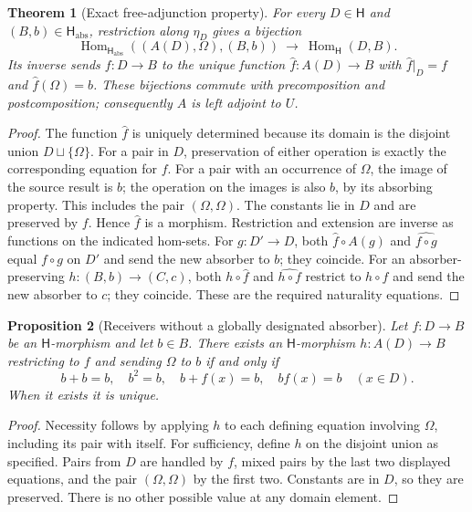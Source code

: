\documentclass[11pt]{article}
\newtheorem{theorem}{Theorem}[section]
\newtheorem{proposition}[theorem]{Proposition}
\theoremstyle{definition}
\newcommand{\HH}{\mathsf H}
\newcommand{\Om}{\Omega}
\begin{document}
\begin{theorem}[Exact free-adjunction property]\label{thm:Auniversal}
For every \(D\in\HH\) and \((B,b)\in\HH_{\mathrm{abs}}\), restriction
along \(\eta_D\) gives a bijection
\[
 \operatorname{Hom}_{\HH_{\mathrm{abs}}}((A(D),\Om),(B,b))
 \ \longrightarrow\ \operatorname{Hom}_{\HH}(D,B).
\tag{4}\label{eq:adjunction}
\]
Its inverse sends \(f:D\to B\) to the unique function
\(\widehat f:A(D)\to B\) with \(\widehat f|_D=f\) and
\(\widehat f(\Om)=b\). These bijections commute with precomposition
and postcomposition; consequently \(A\) is left adjoint to \(U\).
\end{theorem}
\begin{proof}
The function \(\widehat f\) is uniquely determined because its domain is
the disjoint union \(D\sqcup\{\Om\}\). For a pair in \(D\), preservation
of either operation is exactly the corresponding equation for \(f\).
For a pair with an occurrence of \(\Om\), the image of the source result
is \(b\); the operation on the images is also \(b\), by its absorbing
property. This includes the pair \((\Om,\Om)\). The constants lie in
\(D\) and are preserved by \(f\). Hence \(\widehat f\) is a morphism.
Restriction and extension are inverse as functions on the indicated hom-sets.
For \(g:D'\to D\), both \(\widehat f\circ A(g)\) and
\(\widehat{f\circ g}\) equal \(f\circ g\) on \(D'\) and send the new
absorber to \(b\); they coincide. For an absorber-preserving
\(h:(B,b)\to(C,c)\), both \(h\circ\widehat f\) and
\(\widehat{h\circ f}\) restrict to \(h\circ f\) and send the new
absorber to \(c\); they coincide. These are the required naturality
equations.
\end{proof}

\begin{proposition}[Receivers without a globally designated absorber]
Let \(f:D\to B\) be an \(\HH\)-morphism and let \(b\in B\). There
exists an \(\HH\)-morphism \(h:A(D)\to B\) restricting to \(f\) and
sending \(\Om\) to \(b\) if and only if
\[
 b+b=b,\quad b^2=b,\quad b+f(x)=b,\quad bf(x)=b\quad(x\in D).
\tag{5}\label{eq:relative-receiver}
\]
When it exists it is unique.
\end{proposition}
\begin{proof}
Necessity follows by applying \(h\) to each defining equation involving
\(\Om\), including its pair with itself. For sufficiency, define \(h\)
on the disjoint union as specified. Pairs from \(D\) are handled by
\(f\), mixed pairs by the last two displayed equations, and the pair
\((\Om,\Om)\) by the first two. Constants are in \(D\), so they
are preserved. There is no other possible value at any domain element.
\end{proof}
\end{document}
